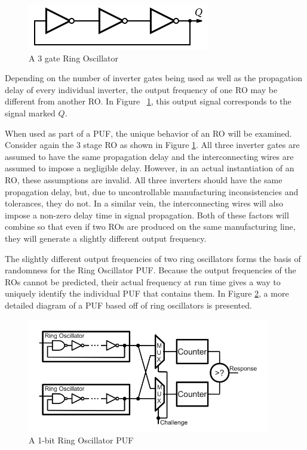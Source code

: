 \begin{figure}[!ht] %
\includegraphics[]{images/ro.png}
\caption{A 3 gate Ring Oscillator}
\label{fig:ro}
\end{figure}
\FloatBarrier

Depending on the number of inverter gates being used
as well as the propagation delay of every individual inverter, the output
frequency of one RO may be different from another RO. In Figure ~\ref{fig:ro},
this output signal corresponds to the signal marked $Q$.

When used as part of a PUF, the unique behavior of an RO will be examined.
Consider again the 3 stage RO as shown in Figure \ref{fig:ro}. All three
inverter gates are assumed to have the same propagation delay and the
interconnecting wires are assumed to impose a negligible delay. However, in
an actual instantiation of an RO, these assumptions are invalid. All three inverters
should have the same propagation delay, but, due to uncontrollable manufacturing
inconsistencies and tolerances, they do not. In a similar vein, the interconnecting
wires will also impose a non-zero delay time in signal propagation. Both of these
factors will combine so that even if two ROs are produced on the same 
manufacturing line, they will generate a slightly different output frequency.

The slightly different output frequencies of two ring oscillators forms the basis
of randomness for the Ring Oscillator PUF. Because the output frequencies of the
ROs cannot be predicted, their actual frequency at run time gives a way to uniquely
identify the individual PUF that contains them. In Figure \ref{fig:ropuf}, a more
detailed diagram of a PUF based off of ring oscillators is presented.

\begin{figure}[ht!]
\includegraphics[width=400px]{images/ropuf.png}
\caption{A 1-bit Ring Oscillator PUF}
\label{fig:ropuf}
\end{figure}
\FloatBarrier


